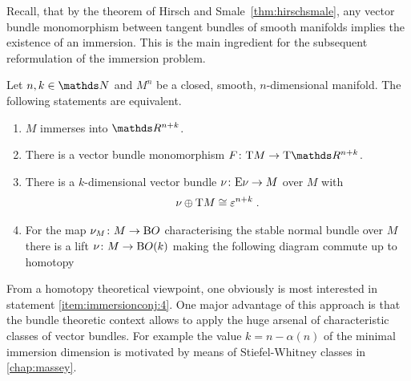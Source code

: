 Recall, that by the theorem of Hirsch and Smale~\ref{thm:hirschsmale},
any vector bundle monomorphism between tangent bundles of smooth
manifolds implies the existence of an immersion.
This is the main ingredient for the subsequent reformulation of the
immersion problem.
\begin{Thm}\label{thm:immersionconj:equivalences}
  Let $n,k\in\Nat$ and $M^n$ be a closed, smooth, $n$-dimensional manifold.
  The following statements are equivalent.
  \begin{enumerate}
  \item\label{item:immersionconj:1}
    $M$ immerses into $\R^{n+k}$.
  \item\label{item:immersionconj:2}
    There is a vector bundle monomorphism $F\colon\T M\to\T{\R^{n+k}}$.
  \item\label{item:immersionconj:3}
    There is a $k$-dimensional vector bundle
    $\nu_{}\colon\mathrm{E}\nu_{}\to M$ over $M$ with
    \begin{gather*}
      \nu_{}\oplus\mathrm{T}M\cong\varepsilon^{n+k}
      \;.
    \end{gather*}
  \item\label{item:immersionconj:4}
    For the map $\nu_{M}\colon M\to\mathrm{B}O$ characterising the stable
    normal bundle over $M$ there is a lift $\nu_{}\colon M\to\mathrm{B}O(k)$
    making the following diagram commute up to homotopy
    \begin{center}
    \end{center}
  \end{enumerate}
\end{Thm}
From a homotopy theoretical viewpoint, one obviously is most
interested in statement \ref{item:immersionconj:4}.
One major advantage of this approach is that the bundle theoretic
context allows to apply the huge arsenal of characteristic classes of
vector bundles.
For example the value $k=n-\alpha(n)$ of the minimal immersion dimension
is motivated by means of Stiefel-Whitney classes in \autoref{chap:massey}.

